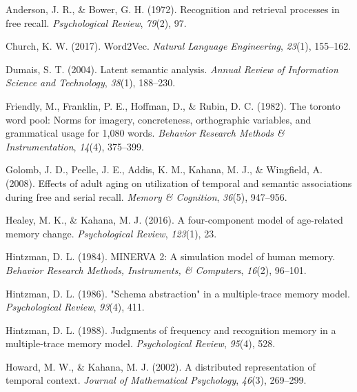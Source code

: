 \documentclass[
  letterpaper,
]{article}
\newlength{\cslhangindent}
\newlength{\cslentryspacingunit} %
\newenvironment{CSLReferences}[2] %
 {%
  \setlength{\parindent}{0pt}
  \ifodd #1
  \let\oldpar\par
  \def\par{\hangindent=\cslhangindent\oldpar}
  \fi
  \setlength{\parskip}{#2\cslentryspacingunit}
 }%
 {}
\begin{document}
\hypertarget{refs}{}
\begin{CSLReferences}{1}{0}
\leavevmode{}%
Anderson, J. R., \& Bower, G. H. (1972). Recognition and retrieval
processes in free recall. \emph{Psychological Review}, \emph{79}(2), 97.

\leavevmode{}%
Church, K. W. (2017). Word2Vec. \emph{Natural Language Engineering},
\emph{23}(1), 155--162.

\leavevmode{}%
Dumais, S. T. (2004). Latent semantic analysis. \emph{Annual Review of
Information Science and Technology}, \emph{38}(1), 188--230.

\leavevmode{}%
Friendly, M., Franklin, P. E., Hoffman, D., \& Rubin, D. C. (1982). The
toronto word pool: Norms for imagery, concreteness, orthographic
variables, and grammatical usage for 1,080 words. \emph{Behavior
Research Methods \& Instrumentation}, \emph{14}(4), 375--399.

\leavevmode{}%
Golomb, J. D., Peelle, J. E., Addis, K. M., Kahana, M. J., \& Wingfield,
A. (2008). Effects of adult aging on utilization of temporal and
semantic associations during free and serial recall. \emph{Memory \&
Cognition}, \emph{36}(5), 947--956.

\leavevmode{}%
Healey, M. K., \& Kahana, M. J. (2016). A four-component model of
age-related memory change. \emph{Psychological Review}, \emph{123}(1),
23.

\leavevmode{}%
Hintzman, D. L. (1984). MINERVA 2: A simulation model of human memory.
\emph{Behavior Research Methods, Instruments, \& Computers},
\emph{16}(2), 96--101.

\leavevmode{}%
Hintzman, D. L. (1986). "Schema abstraction" in a multiple-trace memory
model. \emph{Psychological Review}, \emph{93}(4), 411.

\leavevmode{}%
Hintzman, D. L. (1988). Judgments of frequency and recognition memory in
a multiple-trace memory model. \emph{Psychological Review},
\emph{95}(4), 528.

\leavevmode{}%
Howard, M. W., \& Kahana, M. J. (2002). A distributed representation of
temporal context. \emph{Journal of Mathematical Psychology},
\emph{46}(3), 269--299.


\end{CSLReferences}
\end{document}
